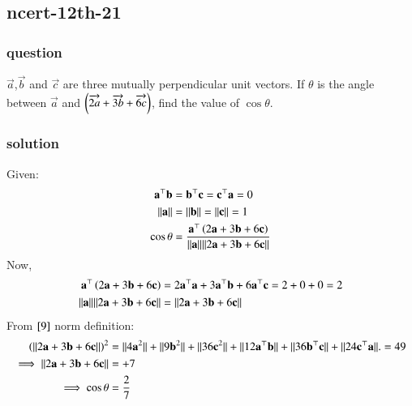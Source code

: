 \documentclass[journal,12pt,onecolumn]{IEEEtran}
\theoremstyle{remark}
\begin{document}
\subsection{ncert-12th-21}
\subsubsection{question}
$\overrightarrow{a}$,$\overrightarrow{b}$ and $\overrightarrow{c}$ are three mutually perpendicular unit vectors. If $\theta$ is the angle between $\overrightarrow{a}$ and $\left(\overrightarrow{2a}+\overrightarrow{3b}+\overrightarrow{6c}\right)$, find the value of $\cos{\theta}$. 
\subsubsection{solution}
Given:
\begin{align}
    \textbf{a}^{\top}\textbf{b} &=  \textbf{b}^{\top}\textbf{c} =  \textbf{c}^{\top}\textbf{a} = 0\\
    \lvert \lvert \textbf{a} \rvert \rvert 
&= \lvert \lvert \textbf{b} \rvert \rvert = \lvert \lvert \textbf{c} \rvert \rvert = 1\\
\cos{\theta} &= \frac{\textbf{a}^{\top}\left(2\textbf{a}+3\textbf{b}+6\textbf{c}\right)}{\lvert \lvert \textbf{a} \rvert \rvert \lvert \lvert 2\textbf{a} + 3\textbf{b} + 6\textbf{c} \rvert \rvert}
\end{align}
Now,
\begin{align}
    \textbf{a}^{\top}\left(2\textbf{a}+3\textbf{b}+6\textbf{c}\right) &= 2\textbf{a}^{\top}\textbf{a} + 3\textbf{a}^{\top}\textbf{b} + 6\textbf{a}^{\top}\textbf{c} = 2 + 0 + 0 = 2\\
    \lvert \lvert \textbf{a} \rvert \rvert \lvert \lvert 2\textbf{a} + 3\textbf{b} + 6\textbf{c} \rvert \rvert &= \lvert \lvert 2\textbf{a} + 3\textbf{b} + 6\textbf{c} \rvert \rvert\\
    \end{align}
From $\eqref{9}$ norm definition:
    \begin{align}
        \left(\lvert \lvert 2\textbf{a} + 3\textbf{b} + 6\textbf{c} \rvert \rvert\right)^2 &= \lvert \lvert 4\textbf{a}^2 \rvert \rvert + \lvert \lvert 9\textbf{b}^2 \rvert \rvert + \lvert \lvert 36\textbf{c}^2  \rvert \rvert + \lvert \lvert 12\textbf{a}^{\top}\textbf{b} \rvert \rvert + \lvert \lvert 36\textbf{b}^{\top}\textbf{c} \rvert \rvert + \lvert \lvert 24\textbf{c}^{\top}\textbf{a} \rvert \rvert.
    = 49\\
    \implies \lvert \lvert 2\textbf{a} + 3\textbf{b} + 6\textbf{c} \rvert \rvert &= +7\\
    \implies \cos{\theta} &= \dfrac{2}{7}
\end{align}
\end{document}
